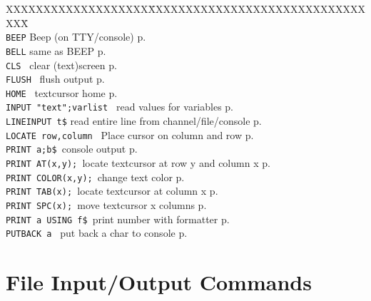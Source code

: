 \begin{tabbing}
XXXXXXXXXXXXXXXXXXX\=XXXXXXXXXXXXXXXXXXXXXXXXXXXXXXXX\=\kill\\
{\tt BEEP}\> Beep (on TTY/console)\> p.\pageref{BEEP}\\
{\tt BELL}\> same as BEEP\> p.\pageref{BELL}\\
{\tt CLS		}\> clear (text)screen \> p.\pageref{CLS}\\
{\tt FLUSH 	}\> flush output\> p.\pageref{FLUSH}\\
{\tt HOME		}\> textcursor home\> p.\pageref{HOME}\\
{\tt INPUT "text";varlist }\> read values for variables\> p.\pageref{INPUT}\\
{\tt LINEINPUT t\$}\> read entire line from channel/file/console\> p.\pageref{LINEINPUT}\\
{\tt LOCATE row,column	}\> Place cursor on column and row\> p.\pageref{LOCATE}\\

{\tt PRINT a;b\$	}\>console output\> p.\pageref{PRINT}\\
{\tt PRINT AT(x,y);  	}\>locate textcursor at row y and column x\> p.\pageref{PRINTbAT}\\
{\tt PRINT COLOR(x,y);  }\>change text color\> p.\pageref{PRINTbCOLOR}\\
{\tt PRINT TAB(x);  	}\>locate textcursor at column x\> p.\pageref{PRINTbTABbANDbSPC}\\
{\tt PRINT SPC(x);  	}\>move textcursor x columns\> p.\pageref{PRINTbTABbANDbSPC}\\
{\tt PRINT a USING f\$	}\>print number with formatter\> p.\pageref{PRINTbUSING}\\
{\tt PUTBACK a 	}\> put back a char to console\> p.\pageref{PUTBACK}\\

 \end{tabbing}

\section{File Input/Output Commands}

